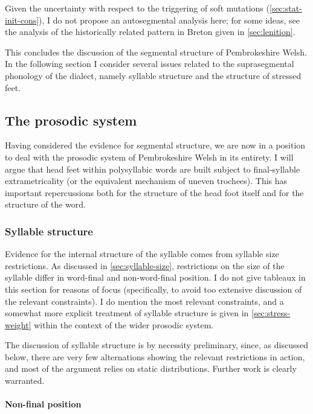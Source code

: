 Given the uncertainty with respect to the triggering of soft mutations (\cref{sec:stat-init-cons}), I do not propose an autosegmental analysis here; for some ideas, see the analysis of the historically related pattern in Breton given in \cref{sec:lenition}.

This concludes the discussion of the segmental structure of Pembrokeshire Welsh. In the following section I consider several issues related to the suprasegmental phonology of the dialect, namely syllable structure and the structure of stressed feet.

\subsection{The prosodic system}
\label{sec:prosodic-system}

Having considered the evidence for segmental structure, we are now in a position to deal with the prosodic system of Pembrokeshire Welsh in its entirety. I will argue that head feet within polysyllabic words are built subject to final-syllable extrametricality (or the equivalent mechanism of uneven trochees). This has important repercussions both for the structure of the head foot itself and for the structure of the word.

\subsubsection{Syllable structure}
\label{sec:syllable-structure-1}

Evidence for the internal structure of the syllable comes from syllable size restrictions. As discussed in \cref{sec:syllable-size}, restrictions on the size of the syllable differ in word\hyp final and non\hyp word\hyp final position. I do not give tableaux in this section for reasons of focus (specifically, to avoid too extensive discussion of the relevant constraints). I do mention the most relevant constraints, and a somewhat more explicit treatment of syllable structure is given in \cref{sec:stress-weight} within the context of the wider prosodic system.

The discussion of syllable structure is by necessity preliminary, since, as discussed below, there are very few alternations showing the relevant restrictions in action, and most of the argument relies on static distributions. Further work is clearly warranted.

\paragraph{Non-final position}
\label{sec:non-final-position}


